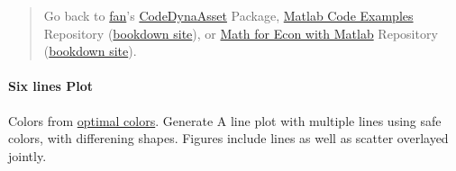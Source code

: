 \documentclass[
]{book}
\begin{document}
\begin{quote}
Go back to \href{http://fanwangecon.github.io/}{fan}'s \href{https://fanwangecon.github.io/CodeDynaAsset/}{CodeDynaAsset} Package, \href{https://fanwangecon.github.io/M4Econ/}{Matlab Code Examples} Repository (\href{https://fanwangecon.github.io/M4Econ/bookdown}{bookdown site}), or \href{https://fanwangecon.github.io/Math4Econ/}{Math for Econ with Matlab} Repository (\href{https://fanwangecon.github.io/Math4Econ/bookdown}{bookdown site}).
\end{quote}

\hypertarget{six-lines-plot}{%
\paragraph{Six lines Plot}\label{six-lines-plot}}

Colors from \href{http://ksrowell.com/blog-visualizing-data/2012/02/02/optimal-colors-for-graphs/}{optimal
colors}.
Generate A line plot with multiple lines using safe colors, with
differening shapes. Figures include lines as well as scatter overlayed
jointly.
\end{document}
